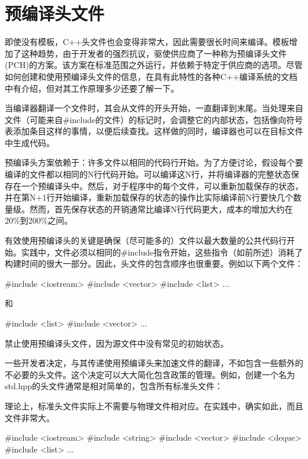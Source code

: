 \section{预编译头文件}

即使没有模板，C++头文件也会变得非常大，因此需要很长时间来编译。模板增加了这种趋势，由于开发者的强烈抗议，驱使供应商了一种称为预编译头文件(PCH)的方案。该方案在标准范围之外运行，并依赖于特定于供应商的选项。尽管如何创建和使用预编译头文件的信息，在具有此特性的各种C++编译系统的文档中有介绍，但对其工作原理多少还要了解一下。

当编译器翻译一个文件时，其会从文件的开头开始，一直翻译到末尾。当处理来自文件（可能来自\#include的文件）的标记时，会调整它的内部状态，包括像向符号表添加条目这样的事情，以便后续查找。这样做的同时，编译器也可以在目标文件中生成代码。

预编译头方案依赖于：许多文件以相同的代码行开始。为了方便讨论，假设每个要编译的文件都以相同的N行代码开始。可以编译这N行，并将编译器的完整状态保存在一个预编译头中。然后，对于程序中的每个文件，可以重新加载保存的状态，并在第N+1行开始编译，重新加载保存的状态的操作比实际编译前N行要快几个数量级。然而，首先保存状态的开销通常比编译N行代码更大，成本的增加大约在20\%到200\%之间。

有效使用预编译头的关键是确保（尽可能多的）文件以最大数量的公共代码行开始。实践中，文件必须以相同的\#include指令开始，这些指令（如前所述）消耗了构建时间的很大一部分。因此，头文件的包含顺序也很重要。例如以下两个文件：

\begin{cpp}
#include <iostream>
#include <vector>
#include <list>
...
\end{cpp}

和

\begin{cpp}
#include <list>
#include <vector>
...
\end{cpp}

禁止使用预编译头文件，因为源文件中没有常见的初始状态。

一些开发者决定，与其传递使用预编译头来加速文件的翻译，不如包含一些额外的不必要的头文件。这个决定可以大大简化包含政策的管理。例如，创建一个名为std.hpp的头文件通常是相对简单的，包含所有标准头文件：

\begin{notice}
理论上，标准头文件实际上不需要与物理文件相对应。在实践中，确实如此，而且文件非常大。
\end{notice}

\begin{cpp}
#include <iostream>
#include <string>
#include <vector>
#include <deque>
#include <list>
...
\end{cpp}

